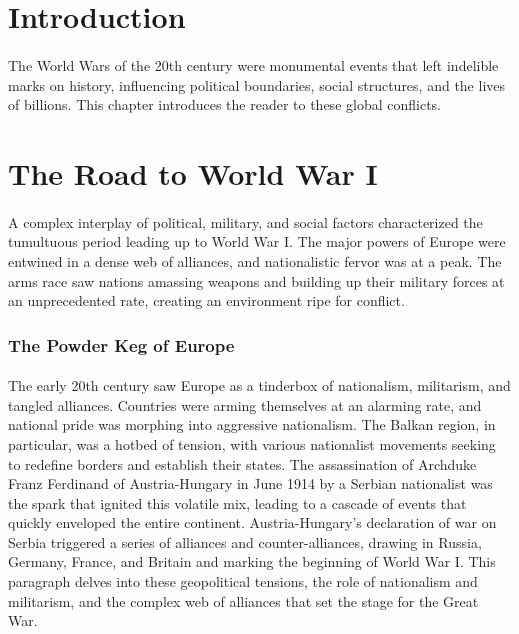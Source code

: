 \documentclass[a4paper,12pt]{book}
\begin{document}
\section*{Introduction}
\paragraph{}
The World Wars of the 20th century were monumental events that left indelible marks on history, influencing political boundaries, social structures, and the lives of billions. This chapter introduces the reader to these global conflicts.

\section*{The Road to World War I}
\paragraph{}
A complex interplay of political, military, and social factors characterized the tumultuous period leading up to World War I. The major powers of Europe were entwined in a dense web of alliances, and nationalistic fervor was at a peak. The arms race saw nations amassing weapons and building up their military forces at an unprecedented rate, creating an environment ripe for conflict.

\subsubsection*{The Powder Keg of Europe}
\paragraph{}
The early 20th century saw Europe as a tinderbox of nationalism, militarism, and tangled alliances. Countries were arming themselves at an alarming rate, and national pride was morphing into aggressive nationalism. The Balkan region, in particular, was a hotbed of tension, with various nationalist movements seeking to redefine borders and establish their states. The assassination of Archduke Franz Ferdinand of Austria-Hungary in June 1914 by a Serbian nationalist was the spark that ignited this volatile mix, leading to a cascade of events that quickly enveloped the entire continent. Austria-Hungary's declaration of war on Serbia triggered a series of alliances and counter-alliances, drawing in Russia, Germany, France, and Britain and marking the beginning of World War I. This paragraph delves into these geopolitical tensions, the role of nationalism and militarism, and the complex web of alliances that set the stage for the Great War.
\end{document}
